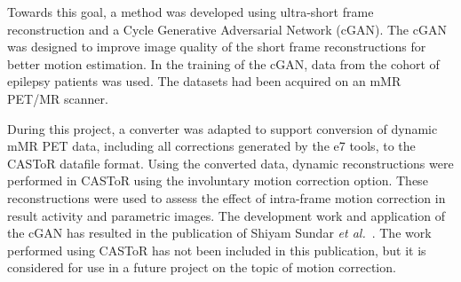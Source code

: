 Towards this goal, a method was developed using ultra-short frame reconstruction 
and a Cycle Generative Adversarial Network (cGAN). The cGAN was designed to improve image quality of the short frame reconstructions for better motion estimation. In the training of the cGAN, data from the cohort of epilepsy patients was used. The datasets had been acquired on an mMR PET/MR scanner.

During this project, a converter was adapted to support conversion of dynamic mMR PET data, including all corrections generated by the e7 tools, to the CASToR datafile format. Using the converted data, dynamic reconstructions were performed in CASToR using the involuntary motion correction option. These reconstructions were used to assess the effect of intra-frame motion correction in result activity and parametric images.
The development work and application of the cGAN has resulted in the publication of Shiyam Sundar \textit{et al.}~\cite{ShiyamSundar2020}. The work performed using CASToR has not been included in this publication, but it is considered for use in a future project on the topic of motion correction.

\cleardoublepage

\cleardoublepage

